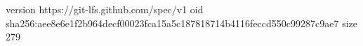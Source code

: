version https://git-lfs.github.com/spec/v1
oid sha256:aee8e6e1f2b964decf00023fca15a5c187818714b4116feccd550c99287c9ae7
size 279
